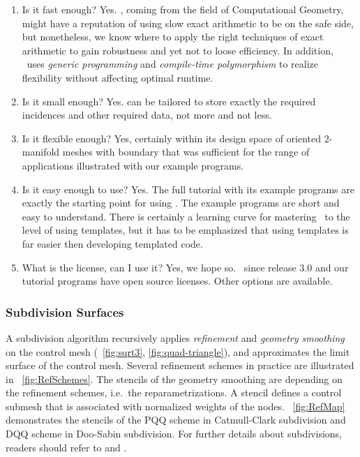 \documentclass[twocolumn]{article}
\begin{document}
\begin{enumerate}
  \item
    Is it fast enough? Yes. \cgal, coming from the field of Computational
    Geometry, might have a reputation of using slow exact arithmetic
    to be on the safe side, but nonetheless, we know where to apply
    the right techniques of exact arithmetic to gain robustness and
    yet not to loose efficiency. In addition, \cgal\ uses
    \emph{generic programming\/} and \emph{compile-time
    polymorphism\/} to realize flexibility without affecting optimal
    runtime.
  \item
    Is it small enough? Yes.  can be
    tailored to store exactly the required incidences and other
    required data, not more and not less.
  \item
    Is it flexible enough? Yes, certainly within its design
    space of oriented 2-manifold meshes with boundary that was
    sufficient for the range of applications illustrated with our
    example programs. 
  \item
    Is it easy enough to use? Yes. The full tutorial with its example
    programs are exactly the starting point for using \cgalpoly. The
    example programs are short and easy to understand. There is
    certainly a learning curve for mastering \CC\ to the level
    of using templates, but it has to be emphasized that
    using templates is far easier then developing templated code.
  \item
    What is the license, can I use it? Yes, we hope so. \cgal\ since
    release 3.0 and our tutorial programs have open source
    licenses. Other options are available.
\end{enumerate}


\subsubsection*{Subdivision Surfaces}

A subdivision algorithm recursively 
applies \emph{refinement} and \emph{geometry smoothing} 
on the control mesh (\figurename\ \ref{fig:sqrt3},  
\ref{fig:quad-triangle}), 
and approximates the limit surface of the control mesh.
Several refinement schemes in practice are illustrated in 
\figurename\ \ref{fig:RefSchemes}. The stencils of the
geometry smoothing are depending on the refinement schemes, 
i.e.\ the reparametrizations. A stencil defines a control
submesh that is associated with normalized weights of the 
nodes. \figurename\ \ref{fig:RefMap} 
demonstrates the stencils of the PQQ scheme  
in Catmull-Clark subdivision and DQQ scheme in Doo-Sabin
subdivision. For further details about subdivisions, readers
should refer to \cite{Warren:subdivision} and \cite{Sub:course:2000}.
   
\end{document}
